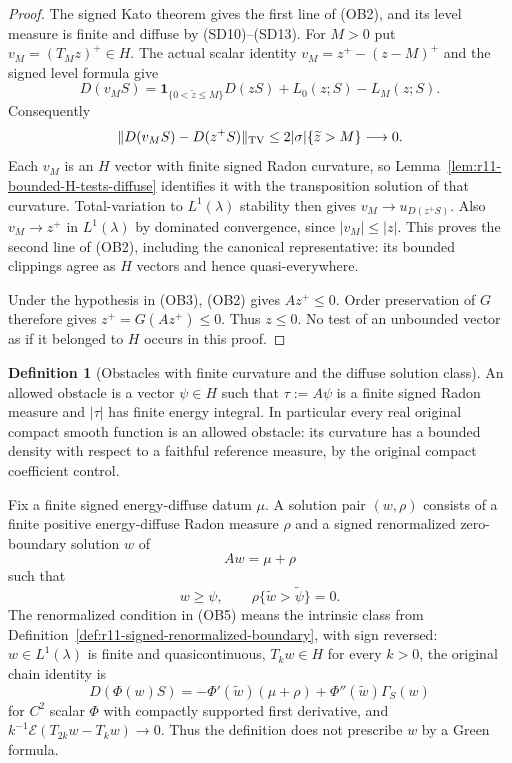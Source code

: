 \documentclass[11pt,a4paper]{article}
\numberwithin{equation}{section}
\theoremstyle{definition}
\newtheorem{definition}[theorem]{Definition}
\theoremstyle{remark}
\begin{document}
\begin{proof}
The signed Kato theorem gives the first line of (OB2), and its level
measure is finite and diffuse by (SD10)--(SD13).  For $M>0$ put
$v_M=(T_Mz)^+\in H$.  The actual scalar identity
$v_M=z^+-(z-M)^+$ and the signed level formula give
\[
 D(v_MS)=\mathbf1_{\{0<\widetilde z\le M\}}D(zS)
                                    +L_0(z;S)-L_M(z;S).
 \tag{OB4}
\]
Consequently
\[
 \|D(v_MS)-D(z^+S)\|_{\rm TV}
                   \le2|\sigma|\{\widetilde z>M\}\longrightarrow0.
\]
Each $v_M$ is an $H$ vector with finite signed Radon curvature, so
Lemma~\ref{lem:r11-bounded-H-tests-diffuse} identifies it with the
transposition solution of that curvature.  Total-variation to
$L^1(\lambda)$ stability then gives
$v_M\to u_{D(z^+S)}$.  Also $v_M\to z^+$ in $L^1(\lambda)$ by
dominated convergence, since $|v_M|\le|z|$.  This proves the second
line of (OB2), including the canonical representative: its bounded
clippings agree as $H$ vectors and hence quasi-everywhere.

Under the hypothesis in (OB3), (OB2) gives $Az^+\le0$.
Order preservation of $G$ therefore gives $z^+=G(Az^+)\le0$.
Thus $z\le0$.  No test of an unbounded vector as if it belonged
to $H$ occurs in this proof.
\end{proof}

\begin{definition}[Obstacles with finite curvature and the diffuse solution class]
\label{def:r11-diffuse-obstacle-class}
An allowed obstacle is a vector $\psi\in H$ such that
$\tau:=A\psi$ is a finite signed Radon measure and $|\tau|$ has
finite energy integral.  In particular every real original compact
smooth function is an allowed obstacle: its curvature has a bounded
density with respect to a faithful reference measure, by the
original compact coefficient control.

Fix a finite signed energy-diffuse datum $\mu$.  A solution pair
$(w,\rho)$ consists of a finite positive energy-diffuse Radon measure
$\rho$ and a signed renormalized zero-boundary solution $w$ of
\[
                               Aw=\mu+\rho
 \tag{OB5}
\]
such that
\[
                     w\ge\psi,\qquad
                     \rho\{\widetilde w>\widetilde\psi\}=0.
 \tag{OB6}
\]
The renormalized condition in (OB5) means the intrinsic class from
Definition~\ref{def:r11-signed-renormalized-boundary}, with sign
reversed: $w\in L^1(\lambda)$ is finite and quasicontinuous,
$T_kw\in H$ for every $k>0$, the original chain identity is
\[
 D(\Phi(w)S)=-\Phi'(\widetilde w)(\mu+\rho)
                         +\Phi''(\widetilde w)\Gamma_S(w)
 \tag{OB7}
\]
for $C^2$ scalar $\Phi$ with compactly supported first derivative,
and $k^{-1}\mathcal E(T_{2k}w-T_kw)\to0$.
Thus the definition does not prescribe $w$ by a Green formula.
\end{definition}
\end{document}
